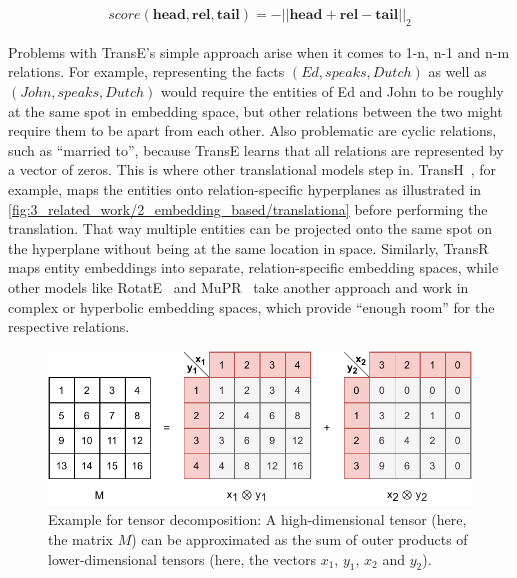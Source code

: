 \begin{align}
    score(\textbf{head}, \textbf{rel}, \textbf{tail}) = {- || \textbf{head} + \textbf{rel} - \textbf{tail} ||}_{2}
    \label{eq:3_related_work/2_embedding_based/trans_e}
\end{align}

Problems with TransE's simple approach arise when it comes to 1-n, n-1 and n-m relations. For example, representing the facts $(Ed, speaks, Dutch)$ as well as $(John, speaks, Dutch)$ would require the entities of Ed and John to be roughly at the same spot in embedding space, but other relations between the two might require them to be apart from each other. Also problematic are cyclic relations, such as ``married to'', because TransE learns that all relations are represented by a vector of zeros. This is where other translational models step in. TransH~\cite{Wang2014KnowledgeGE}, for example, maps the entities onto relation-specific hyperplanes as illustrated in \autoref{fig:3_related_work/2_embedding_based/translationa} before performing the translation. That way multiple entities can be projected onto the same spot on the hyperplane without being at the same location in space. Similarly, TransR~\cite{Lin2015LearningEA} maps entity embeddings into separate, relation-specific embedding spaces, while other models like RotatE~\cite{Sun2019RotatEKG} and MuPR~\cite{Balazevic2019MultirelationalPG} take another approach and work in complex or hyperbolic embedding spaces, which provide ``enough room'' for the respective relations.

\begin{figure}[t]
    \centering
    \includegraphics{3_related_work/2_embedding_based/tensor_decomposition}
    \caption{Example for tensor decomposition: A high-dimensional tensor (here, the matrix $M$) can be approximated as the sum of outer products of lower-dimensional tensors (here, the vectors $x_1$, $y_1$, $x_2$ and $y_2$).}
    \label{fig:3_related_work/2_embedding_based/tensor_decomposition}
\end{figure}

